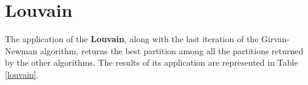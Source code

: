     \begin{table}[H]
        \centering
        \begin{subtable}{\textwidth}
        \end{subtable}
        \caption{Evaluation of the partition obtained by the application of the Label Propagaion algorithm.}
        \label{labelprop}
    \end{table}


\section{Louvain} %
\label{sec:louvain}
    The application of the \textbf{Louvain}, along with the last iteration of the Girvan-Newman algorithm,
    returns the best partition among all the partitions returned by the other algorithms. The results of its
    application are represented in Table \ref{louvain}.

    \begin{table}[H]
        \centering
        \begin{subtable}{\textwidth}
        \end{subtable}
        \caption{Evaluation of the partition obtained by the application of the Louvain algorithm.}
        \label{louvain}
    \end{table}

